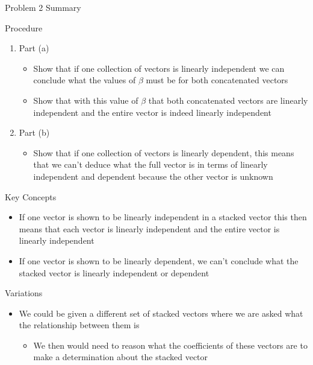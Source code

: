 \begin{summary}{Problem 2 Summary}
    \begin{statement}{Procedure}
        \begin{enumerate}[label = (\alph*)]
            \item Part (a)
            \begin{itemize}
                \item Show that if one collection of vectors is linearly independent we can conclude what the values of $\beta$ must be for both concatenated vectors
                \item Show that with this value of $\beta$ that both concatenated vectors are linearly independent and the entire vector is indeed linearly independent
            \end{itemize}
            \item Part (b)
            \begin{itemize}
                \item Show that if one collection of vectors is linearly dependent, this means that we can't deduce what the full vector is in terms of linearly independent and dependent because the 
                other vector is unknown
            \end{itemize}
        \end{enumerate}
    \end{statement}
    \begin{statement}{Key Concepts}
        \begin{itemize}
            \item If one vector is shown to be linearly independent in a stacked vector this then means that each vector is linearly independent and the entire vector is linearly independent
            \item If one vector is shown to be linearly dependent, we can't conclude what the stacked vector is linearly independent or dependent
        \end{itemize}
    \end{statement}
    \begin{statement}{Variations}
        \begin{itemize}
            \item We could be given a different set of stacked vectors where we are asked what the relationship between them is
            \begin{itemize}
                \item We then would need to reason what the coefficients of these vectors are to make a determination about the stacked vector
            \end{itemize}
        \end{itemize}
    \end{statement}
\end{summary}

